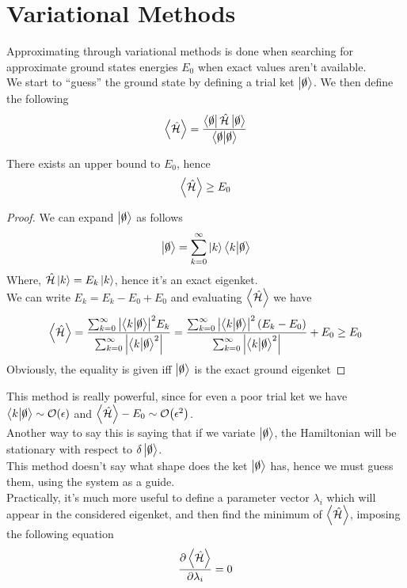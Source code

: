 \documentclass[../qm.tex]{subfiles}
\begin{document}
	\section{Variational Methods}
	Approximating through variational methods is done when searching for approximate ground states energies $E_0$ when exact values aren't available.\\
	We start to ``guess''  the ground state by defining a trial ket $\ket{\slashed{0}}$. We then define the following
	\begin{equation}
		\expval{\hat{\mathcal{H}}}=\frac{\bra{\slashed{0}}\hat{\mathcal{H}}\ket{\slashed{0}}}{\braket{\slashed{0}}}
		\label{eq:slashed0ket}
	\end{equation}
	\begin{thm}
		There exists an upper bound to $E_0$, hence
		\begin{equation*}
			\expval{\hat{\mathcal{H}}}\ge E_0
		\end{equation*}
	\end{thm}
	\begin{proof}
		We can expand $\ket{\slashed{0}}$ as follows
		\begin{equation*}
			\ket{\slashed{0}}=\sum_{k=0}^{\infty}\ket{k}\bra{k}\ket{\slashed{0}}
		\end{equation*}
		Where, $\hat{\mathcal{H}}\ket{k}=E_k\ket{k}$, hence it's an exact eigenket.\\
		We can write $E_k=E_k-E_0+E_0$ and evaluating $\expval{\hat{\mathcal{H}}}$ we have
		\begin{equation*}
			\expval{\hat{\mathcal{H}}}=\frac{\sum_{k=0}^{\infty}\abs{\bra{k}\ket{\slashed{0}}}^2E_k}{\sum_{k=0}^{\infty}\abs{\bra{k}\ket{\slashed{0}}^2}}=
			\frac{\sum_{k=0}^{\infty}\abs{\bra{k}\ket{\slashed{0}}}^2\left( E_k-E_0 \right)}{\sum_{k=0}^{\infty}\abs{\bra{k}\ket{\slashed{0}}^2}}+E_0\ge E_0
		\end{equation*}
		Obviously, the equality is given iff $\ket{\slashed{0}}$ is the exact ground eigenket
	\end{proof}
	This method is really powerful, since for even a poor trial ket we have $\bra{k}\ket{\sla{0}}\sim\order{\epsilon}$ and $\expval{\opr{\ham}}-E_0\sim\order{\epsilon^2}$.\\
	Another way to say this is saying that if we variate $\ket{\slashed{0}}$, the Hamiltonian will be stationary with respect to $\delta\ket{\slashed{0}}$.\\
	This method doesn't say what shape does the ket $\ket{\slashed{0}}$ has, hence we must guess them, using the system as a guide.\\
	Practically, it's much more useful to define a parameter vector $\lambda_i$ which will appear in the considered eigenket, and then find the minimum of $\expval{\hat{\mathcal{H}}}$, imposing the following equation
	\begin{equation}
		\pdv{\expval{\hat{\mathcal{H}}}}{\lambda_i}=0
		\label{eq:extremalvarmethod}
	\end{equation}
\end{document}
